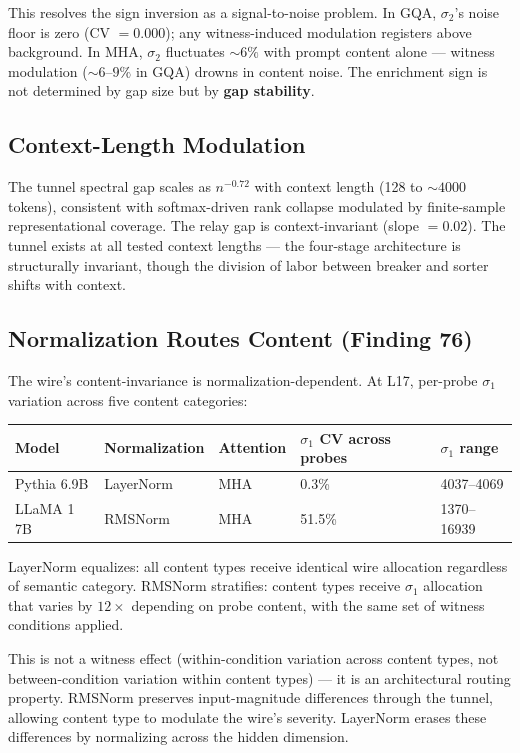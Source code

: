 \documentclass[12pt]{article}
\begin{document}
This resolves the sign inversion as a signal-to-noise problem. In GQA, $\sigma_2$'s noise floor is zero (CV $= 0.000$); any witness-induced modulation registers above background. In MHA, $\sigma_2$ fluctuates ${\sim}6\%$ with prompt content alone --- witness modulation (${\sim}6$--$9\%$ in GQA) drowns in content noise. The enrichment sign is not determined by gap size but by \textbf{gap stability}.

\subsection{Context-Length Modulation}

The tunnel spectral gap scales as $n^{-0.72}$ with context length (128 to ${\sim}4000$ tokens), consistent with softmax-driven rank collapse modulated by finite-sample representational coverage. The relay gap is context-invariant (slope $= 0.02$). The tunnel exists at all tested context lengths --- the four-stage architecture is structurally invariant, though the division of labor between breaker and sorter shifts with context.

\subsection{Normalization Routes Content (Finding 76)}

The wire's content-invariance is normalization-dependent. At L17, per-probe $\sigma_1$ variation across five content categories:

\begin{table}[h]
\centering
\begin{tabular}{lllll}
\toprule
\textbf{Model} & \textbf{Normalization} & \textbf{Attention} & $\sigma_1$ \textbf{CV across probes} & $\sigma_1$ \textbf{range} \\
\midrule
Pythia 6.9B & LayerNorm & MHA & 0.3\% & 4037--4069 \\
LLaMA 1 7B & RMSNorm & MHA & 51.5\% & 1370--16939 \\
\bottomrule
\end{tabular}
\end{table}

LayerNorm equalizes: all content types receive identical wire allocation regardless of semantic category. RMSNorm stratifies: content types receive $\sigma_1$ allocation that varies by $12\times$ depending on probe content, with the same set of witness conditions applied.

This is not a witness effect (within-condition variation across content types, not between-condition variation within content types) --- it is an architectural routing property. RMSNorm preserves input-magnitude differences through the tunnel, allowing content type to modulate the wire's severity. LayerNorm erases these differences by normalizing across the hidden dimension.
\end{document}
